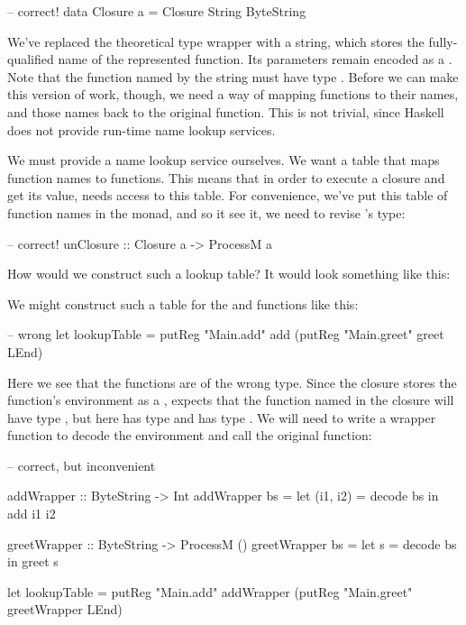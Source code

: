 \documentclass[preprint]{sigplanconf}
\begin{document}
\begin{code}
-- correct!
data Closure a = Closure String ByteString
\end{code}

We've replaced the theoretical  type wrapper with a string, which stores the fully-qualified name of the represented function. Its parameters remain encoded as a . Note that the function named by the string must have type . Before we can make this version of  work, though, we need a way of mapping functions to their names, and those names back to the original function. This is not trivial, since Haskell does not provide run-time name lookup services.

We must provide a name lookup service ourselves. We want a table that maps function names to functions. This means that in order to execute a closure and get its value,  needs access to this table. For convenience, we've put this table of function names in the  monad, and so it see it, we need to revise 's type:

\begin{code}
-- correct!
unClosure :: Closure a -> ProcessM a
\end{code}

How would we construct such a lookup table? It would look something like this:

We might construct such a table for the  and  functions like this:

\begin{code}
-- wrong
let lookupTable =
  putReg "Main.add" add
    (putReg "Main.greet" greet LEnd)
\end{code}

Here we see that the functions are of the wrong type. Since the closure stores the function's environment as a ,  expects that the function named in the closure will have type , but here  has type  and  has type . We will need to write a wrapper function to decode the environment and call the original function:

\begin{code}
-- correct, but inconvenient

addWrapper :: ByteString -> Int
addWrapper bs = 
  let (i1, i2) = decode bs
   in add i1 i2

greetWrapper :: ByteString -> ProcessM ()
greetWrapper bs =
  let s = decode bs
   in greet s             

let lookupTable =
  putReg "Main.add" addWrapper
    (putReg "Main.greet" greetWrapper LEnd)
\end{code}
\end{document}
